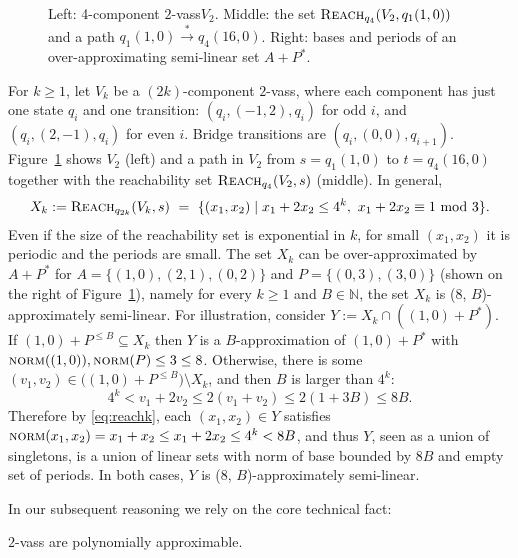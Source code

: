 \documentclass[a4paper, UKenglish, cleveref, autoref, thm-restate]{lipics-v2021}
\newcommand{\sandwich}{polynomially approximable\xspace}
\newcommand{\N}{\mathbb{N}}
\newcommand{\set}[1]{\{#1\}}
\newcommand{\reach}{\textsc{Reach}}
\newcommand{\trans}[1]{\stackrel{#1}{\longrightarrow}}
\newcommand{\tran}{\trans{*}}
\newcommand{\norm}{\textsc{norm}}
\newcommand{\kanapka}[2]{(#1, #2)-approximately semi-linear}
\newcommand{\vass}{{\sc vass}\xspace}
\newcommand{\dvass}{\parvass 2}
\newcommand{\parvass}[1]{{$#1$-\vass}\xspace}
\begin{document}
\begin{figure}[t]
\begin{minipage}{0.32\textwidth}
\end{minipage}
\caption{Left: 4-component \dvass $V_2$. 
Middle: the set $\reach_{q_4}(V_2, q_1(1,0))$ and a path $q_1(1,0) \tran q_4(16,0)$.
Right: bases 
and periods 
of an over-approximating semi-linear set $A+P^*$.}
\label{fig:zigzag}
\end{figure}

\begin{example}
For $k\geq 1$, let $V_k$ be a $(2k)$-component \dvass, where each component has just one state $q_i$
and one transition:
$(q_i, (-1,2), q_i)$ for odd $i$, and $(q_i, (2,-1), q_i)$ for even $i$.
Bridge transitions are $(q_i, (0,0), q_{i+1})$.
Figure~\ref{fig:zigzag} shows $V_2$ (left) and 
a path in $V_2$ from $s = q_1(1,0)$ to $t = q_4(16,0)$ together with 
the reachability set $\reach_{q_4}(V_2, s)$ (middle).
In general,
\begin{align} \label{eq:reachk}
X_k := \reach_{q_{2k}}(V_k, s) \ = \ \set{(x_1,x_2) \mid x_1+2x_2 \leq 4^k, \  x_1+2x_2 \equiv 1 \!\! \mod 3}.
\end{align}
Even if the size of the reachability set is 
exponential in $k$, for small $(x_1, x_2)$ it is periodic and the periods are small.
The set $X_k$ can be over-approximated by $A + P^*$ for $A = \set{(1,0),(2,1),(0,2)}$ and $P = \set{(0,3),(3,0)}$
(shown on the right of Figure~\ref{fig:zigzag}), namely for every $k\geq 1$ and $B\in\N$,
the set $X_k$ is \kanapka {$8$} {$B$}. 
For illustration, consider $Y := X_k \cap ((1,0) + P^*)$.
If $(1,0) + P^{\leq B} \subseteq X_k$ then $Y$ is a $B$-approximation
of $(1,0) + P^*$ with $\norm((1,0)), \norm(P) \leq 3 \leq 8$. 
Otherwise, there is some $(v_1, v_2) \in \big((1,0) + P^{\leq B}\big)\setminus X_k$, and
then $B$ is larger than $4^k$:
\[
4^k < v_1 + 2 v_2 \leq 2(v_1 + v_2) \leq 2(1+3B) \leq 8B.
\]
Therefore by \eqref{eq:reachk}, each $(x_1,x_2) \in Y$ satisfies 
$\norm(x_1,x_2) = x_1 + x_2 \leq x_1 + 2x_2 \leq 4^k < 8B$, and thus
$Y$, seen as a union of singletons, is a union of 
linear sets with norm of base bounded by $8B$ and empty set of periods. 
In both cases, 
$Y$ is \kanapka {$8$} {$B$}. 
\end{example} 
In our subsequent reasoning we rely on the core technical fact:
\begin{lemma}\label{lem:2vass-sandwich}
\dvass are \sandwich.
\end{lemma}
\end{document}
